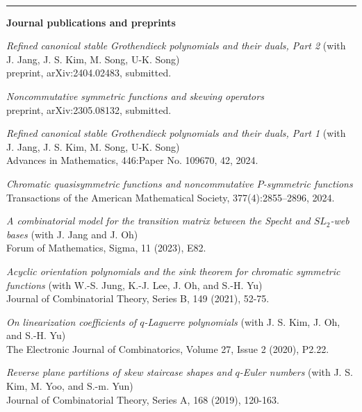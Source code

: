 \documentclass[letterpaper,11pt]{article}
\newcommand{\resheading}[1]{
	\vspace{5pt}
	\textbf{\sffamily{\mbox{~}\makebox[6.762in][l]{\large #1} \vphantom{p\^{E}}}} \\[-6pt]
	\par\noindent\rule{\textwidth}{0.4pt}
}
\begin{document}
\vspace{1cm}
\resheading{Publications}
{\bf Journal publications and preprints}
\begin{etaremune}
    \item \emph{Refined canonical stable Grothendieck polynomials and their duals, Part 2} (with J. Jang, J. S. Kim, M. Song, U-K. Song) \\
    preprint, arXiv:2404.02483, submitted.

    \item \emph{Noncommutative symmetric functions and skewing operators} \\
    preprint, arXiv:2305.08132, submitted.

    \item \emph{Refined canonical stable Grothendieck polynomials and their duals, Part 1} (with J. Jang, J. S. Kim, M. Song, U-K. Song) \\
    Advances in Mathematics, 446:Paper No. 109670, 42, 2024.
    
    \item \emph{Chromatic quasisymmetric functions and noncommutative $P$-symmetric functions} \\
    Transactions of the American Mathematical Society, 377(4):2855–2896, 2024.

    \item \emph{A combinatorial model for the transition matrix between the Specht and $SL_2$-web bases} (with J. Jang and J. Oh) \\
    Forum of Mathematics, Sigma, 11 (2023), E82.
    
    \item \emph{Acyclic orientation polynomials and the sink theorem for chromatic symmetric functions} (with W.-S. Jung, K.-J. Lee, J. Oh, and S.-H. Yu) \\
    Journal of Combinatorial Theory, Series B, 149 (2021), 52-75.

    \item \emph{On linearization coefficients of $q$-Laguerre polynomials} (with J. S. Kim, J. Oh, and S.-H. Yu) \\
    The Electronic Journal of Combinatorics, Volume 27, Issue 2 (2020), P2.22.

    \item \emph{Reverse plane partitions of skew staircase shapes and $q$-Euler numbers} (with J. S. Kim, M. Yoo, and S.-m. Yun) \\
    Journal of Combinatorial Theory, Series A, 168 (2019), 120-163.
\end{etaremune}
	
\end{document}

